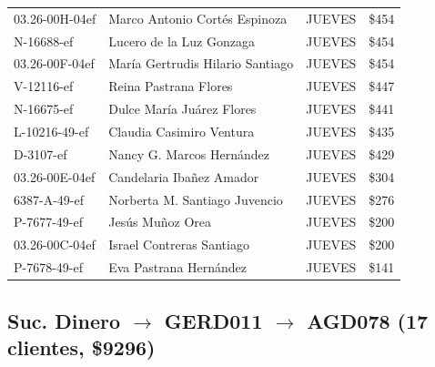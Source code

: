 \documentclass[11pt,a4paper]{article}
\newcommand{\money}[1]{\$\num{#1}}
\begin{document}
\begin{center}
\begin{longtable}{lp{5.5cm}lr}
03.26-00H-04ef & Marco Antonio Cort\'es Espinoza & JUEVES & \money{454} \\
N-16688-ef & Lucero de la Luz Gonzaga & JUEVES & \money{454} \\
03.26-00F-04ef & Mar\'ia Gertrudis Hilario Santiago & JUEVES & \money{454} \\
V-12116-ef & Reina Pastrana Flores & JUEVES & \money{447} \\
N-16675-ef & Dulce Mar\'ia Ju\'arez Flores & JUEVES & \money{441} \\
L-10216-49-ef & Claudia Casimiro Ventura & JUEVES & \money{435} \\
D-3107-ef & Nancy G. Marcos Hern\'andez & JUEVES & \money{429} \\
03.26-00E-04ef & Candelaria Iba\~nez Amador & JUEVES & \money{304} \\
6387-A-49-ef & Norberta M. Santiago Juvencio & JUEVES & \money{276} \\
P-7677-49-ef & Jes\'us Mu\~noz Orea & JUEVES & \money{200} \\
03.26-00C-04ef & Israel Contreras Santiago & JUEVES & \money{200} \\
P-7678-49-ef & Eva Pastrana Hern\'andez & JUEVES & \money{141} \\
\bottomrule
\end{longtable}
\end{center}

\subsection{Suc. Dinero $\rightarrow$ GERD011 $\rightarrow$ AGD078 (17 clientes, \money{9296})}
\end{document}
